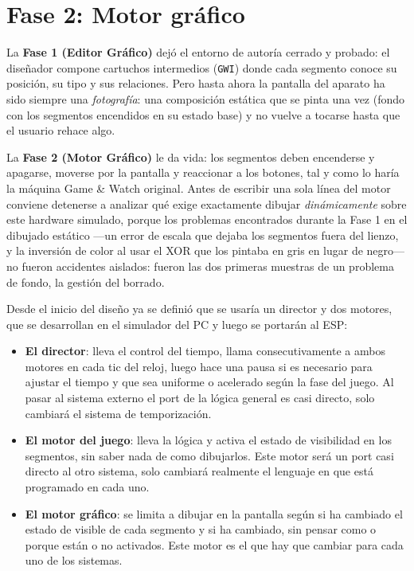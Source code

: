 \section{Fase 2: Motor gráfico}
\label{sec:Fase2_MotorGrafico}

La \textbf{Fase 1 (Editor Gráfico)} dejó el entorno de autoría cerrado y probado: el diseñador compone cartuchos intermedios (\texttt{GWI}) donde cada segmento conoce su posición, su tipo y sus relaciones. Pero hasta ahora la pantalla del aparato ha sido siempre una \emph{fotografía}: una composición estática que se pinta una vez (fondo con los segmentos encendidos en su estado base) y no vuelve a tocarse hasta que el usuario rehace algo. 

La \textbf{Fase 2 (Motor Gráfico)} le da vida: los segmentos deben encenderse y apagarse, moverse por la pantalla y reaccionar a los botones, tal y como lo haría la máquina Game \& Watch original. Antes de escribir una sola línea del motor conviene detenerse a analizar qué exige exactamente dibujar \emph{dinámicamente} sobre este hardware simulado, porque los problemas encontrados durante la Fase 1 en el dibujado estático ---un error de escala que dejaba los segmentos fuera del lienzo, y la inversión de color al usar el XOR que los pintaba en gris en lugar de negro--- no fueron accidentes aislados: fueron las dos primeras muestras de un problema de fondo, la gestión del borrado.

Desde el inicio del diseño ya se definió que se usaría un director y dos motores, que se desarrollan en el simulador del PC y luego se portarán al ESP:

\begin{itemize}
	\item \textbf{El director}: lleva el control del tiempo,  llama consecutivamente a ambos motores en cada tic del reloj, luego hace una pausa si es necesario para ajustar el tiempo y que sea uniforme o acelerado según la fase del juego. Al pasar al sistema externo el port  de la lógica general es casi directo, solo cambiará el sistema de temporización.

	\item \textbf{El motor del juego}: lleva la lógica y activa el estado de visibilidad en los segmentos, sin saber nada de como dibujarlos. Este motor será un port casi directo al otro sistema, solo cambiará realmente el lenguaje en que está programado en cada uno.
	
	\item \textbf{El motor gráfico}: se limita a dibujar en la pantalla según si ha cambiado el estado de visible de cada segmento y si ha cambiado, sin pensar como o porque están o no activados. Este motor es el que hay que cambiar para cada uno de los sistemas.
\end{itemize}

